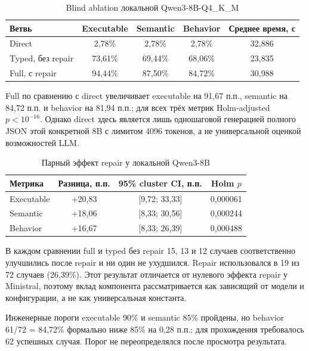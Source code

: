 \begin{table}[H]
    \centering
    \caption{Blind ablation локальной Qwen3-8B-Q4\_K\_M}
    \label{tab:local-qwen8b-ablation}
    \small
    \begin{tabular}{lcccc}
        \toprule
        Ветвь & Executable & Semantic & Behavior & Среднее время, с \\
        \midrule
        Direct & 2,78\% & 2,78\% & 2,78\% & 32,886 \\
        Typed, без repair & 73,61\% & 69,44\% & 68,06\% & 23,835 \\
        Full, с repair & 94,44\% & 87,50\% & 84,72\% & 30,988 \\
        \bottomrule
    \end{tabular}
\end{table}

Full по сравнению с direct увеличивает executable на 91,67 п.п., semantic на 84,72 п.п. и behavior на 81,94 п.п.; для всех трёх метрик Holm-adjusted $p<10^{-16}$. Однако direct здесь является лишь одношаговой генерацией полного JSON этой конкретной 8B с лимитом 4096 токенов, а не универсальной оценкой возможностей LLM.

\begin{table}[H]
    \centering
    \caption{Парный эффект repair у локальной Qwen3-8B}
    \label{tab:local-qwen8b-repair-effect}
    \small
    \begin{tabular}{lccc}
        \toprule
        Метрика & Разница, п.п. & 95\% cluster CI, п.п. & Holm $p$ \\
        \midrule
        Executable & +20,83 & [9,72; 33,33] & 0,000061 \\
        Semantic & +18,06 & [8,33; 30,56] & 0,000244 \\
        Behavior & +16,67 & [8,33; 26,39] & 0,000488 \\
        \bottomrule
    \end{tabular}
\end{table}

В каждом сравнении full и typed без repair 15, 13 и 12 случаев соответственно улучшились после repair и ни один не ухудшился. Repair использовался в 19 из 72 случаев (26,39\%). Этот результат отличается от нулевого эффекта repair у Ministral, поэтому вклад компонента рассматривается как зависящий от модели и конфигурации, а не как универсальная константа.

Инженерные пороги executable 90\% и semantic 85\% пройдены, но behavior 61/72 = 84,72\% формально ниже 85\% на 0,28 п.п.; для прохождения требовалось 62 успешных случая. Порог не переопределялся после просмотра результата.

